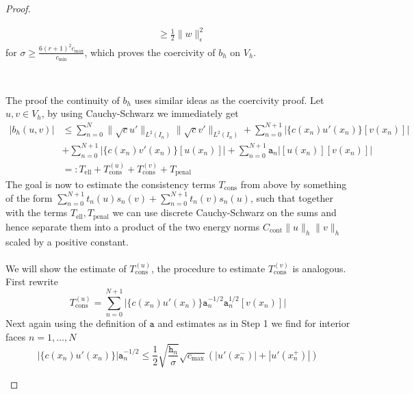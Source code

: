 \begin{proof}
\begin{proofstep}[Coercivity]
\begin{align*}
			         & \geq \frac{1}{2} \|w\|_{\epsilon}^2
		\end{align*}
		for $\sigma \geq \frac{6 (r+1)^2 c_{\max} }{c_{\min}}$, which proves the coercivity
		of $b_h$ on $V_h$.
	\end{proofstep}
	\\
	\begin{proofstep}[Continuity]
		The proof the continuity of $b_h$ uses similar ideas as the coercivity proof. Let
		$u,v \in V_h$, by using Cauchy-Schwarz we
		immediately get
		\begin{align}
			|b_h(u,v)| & \leq \sum_{n=0}^{N} \|\sqrt{c}u'\|_{L^2(I_n)} \|\sqrt{c}v'\|_{L^2(I_n)}
			+  \sum_{n=0}^{N+1} \big| \{c(x_n)u'(x_n)\}[v(x_n)] \big| \nonumber                               \\
			           & +\sum_{n=0}^{N+1} \big|\{c(x_n)v'(x_n)\}[u(x_n)]\big|
			+\sum_{n=0}^{N+1} \texttt{a}_n \big|[u(x_n)][v(x_n)]\big| \nonumber                               \\
			           & =: T_{\text{ell}} + T_{\text{cons}}^{(u)} + T_{\text{cons}}^{(v)} + T_{\text{penal}}
			\label{eq:cont_thr_estimate_elliptic_part}
		\end{align}
		The goal is now to estimate the consistency terms $T_{\text{cons}}$ from above by something of the form
		$ \sum_{n=0}^{N+1} t_n(u) s_n(v) + \sum_{n=0}^{N+1} t_n(v) s_n(u)$, such that together with the terms
		$T_{\text{ell}}, T_{\text{penal}}$ we can use discrete Cauchy-Schwarz on the sums and hence separate them into
		a product of the two energy norms $C_{\text{cont}} \|u\|_{h}\|v\|_{h} $ scaled by a positive constant. \\ \\
		We will show the estimate of $T_{\text{cons}}^{(u)}$, the procedure to estimate $T_{\text{cons}}^{(v)}$ is analogous. \\
		First rewrite
		\begin{equation}
			\label{eq:continuity_thr_consistency_term}
			T_{\text{cons}}^{(u)} = \sum_{n=0}^{N+1} \big| \{c(x_n)u'(x_n)\} \texttt{a}_n^{-1/2}\texttt{a}_n^{1/2} [v(x_n)] \big|
		\end{equation}
		Next again using the definition of $\texttt{a}$ and estimates as in Step 1 we find for interior faces $n = 1,\ldots,N$
		\begin{equation}
			\big|\{c(x_n)u'(x_n)\}\big|\texttt{a}_n^{-1/2}
			\leq \frac{1}{2} \sqrt{\frac{\texttt{h}_n}{\sigma}} \sqrt{c_{\max}}
			\left( |u'(x_n^-)| + |u'(x_n^+)| \right) \nonumber
		\end{equation}

\end{proofstep}
\end{proof}
